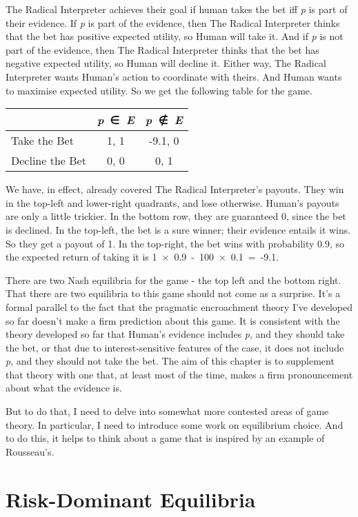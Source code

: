 \documentclass[
  11pt,
]{book}
\begin{document}
The Radical Interpreter achieves their goal if human takes the bet iff \emph{p} is part of their evidence. If \emph{p} is part of the evidence, then The Radical Interpreter thinks that the bet has positive expected utility, so Human will take it. And if \emph{p} is not part of the evidence, then The Radical Interpreter thinks that the bet has negative expected utility, so Human will decline it. Either way, The Radical Interpreter wants Human's action to coordinate with theirs. And Human wants to maximise expected utility. So we get the following table for the game.

\begin{longtable}[]{@{}lcc@{}}
\toprule()
& \emph{p}~∈~\emph{E} & \emph{p}~∉~\emph{E} \\
\midrule()
\endhead
Take the Bet & 1, 1 & -9.1, 0 \\
Decline the Bet & 0, 0 & 0, 1 \\
\bottomrule()
\end{longtable}

We have, in effect, already covered The Radical Interpreter's payouts. They win in the top-left and lower-right quadrants, and lose otherwise. Human's payouts are only a little trickier. In the bottom row, they are guaranteed 0, since the bet is declined. In the top-left, the bet is a sure winner; their evidence entails it wins. So they get a payout of 1. In the top-right, the bet wins with probability 0.9, so the expected return of taking it is 1~×~0.9~-~100~×~0.1~=~‑9.1.

There are two Nash equilibria for the game - the top left and the bottom right. That there are two equilibria to this game should not come as a surprise. It's a formal parallel to the fact that the pragmatic encroachment theory I've developed so far doesn't make a firm prediction about this game. It is consistent with the theory developed so far that Human's evidence includes \emph{p}, and they should take the bet, or that due to interest-sensitive features of the case, it does not include \emph{p}, and they should not take the bet. The aim of this chapter is to supplement that theory with one that, at least most of the time, makes a firm pronouncement about what the evidence is.

But to do that, I need to delve into somewhat more contested areas of game theory. In particular, I need to introduce some work on equilibrium choice. And to do this, it helps to think about a game that is inspired by an example of Rousseau's.

\hypertarget{globalgame}{%
\section{Risk-Dominant Equilibria}\label{globalgame}}
\end{document}
